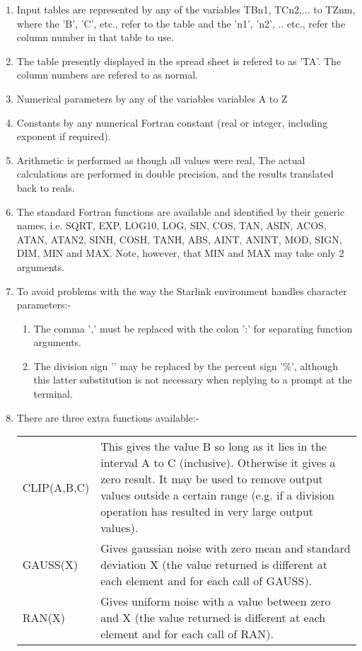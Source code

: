 \begin{small}
{{\begin{enumerate}
 \item Input tables are represented by any of the variables TBn1, TCn2,...
       to TZnm, where the 'B', 'C', etc., refer to the table and the 'n1',
       'n2', .. etc., refer the column number in that table to use.

 \item The table presently displayed in the spread sheet is refered to 
       as 'TA'. The column numbers are refered to as normal.
     
 \item Numerical parameters by any of the variables variables A to Z
 \item Constants by any numerical Fortran constant (real or integer,
    including exponent if required).
 \item Arithmetic is performed as though all values were real, The actual
    calculations are performed in double precision, and the results
    translated back to reals.
 \item The standard Fortran functions are available and identified
    by their generic names, i.e. SQRT, EXP, LOG10, LOG, SIN, COS, TAN,
    ASIN, ACOS, ATAN, ATAN2, SINH, COSH, TANH, ABS, AINT, ANINT, MOD,
    SIGN, DIM, MIN and MAX. Note, however, that MIN and MAX may take only
    2 arguments.
 \item To avoid problems with the way the Starlink environment
    handles character parameters:-
    \begin{enumerate}
       \item The comma ',' must be replaced with
             the colon ':' for separating function arguments.
       \item The division sign '\/' may be replaced by the percent sign '\%',
             although this latter substitution is not necessary when
             replying to a prompt at the terminal.
    \end{enumerate}
 \item There are three extra functions available:-

    \begin{tabular}{lp{4in}}
    CLIP(A,B,C) & This gives the value B so long as it lies in the
                 interval A to C (inclusive). Otherwise it gives a
                 zero result. It may be used to remove output values
                 outside a certain range (e.g. if a division operation
                 has resulted in very large output values). \\
    GAUSS(X)    & Gives gaussian noise with zero mean and standard
                 deviation X (the value returned is different at each
                 element and for each call of GAUSS). \\
    RAN(X)      & Gives uniform noise with a value between zero and X
                 (the value returned is different at each element and
                 for each call of RAN). \\
    \end{tabular}
  \end{enumerate}
                                                                               
}}
\end{small}

